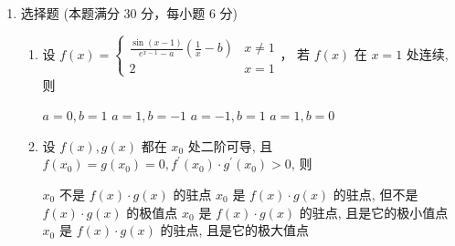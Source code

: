 \begin{enumerate}
{\begin{enumerate}
	\item
	令 $u=\sqrt[3]{x+2}$，则 $x=u^{3}-2$，$dx=3u^{2}du$，
	\begin{align*}
	\int\frac{3u^{2}}{1+u}du&=3\int\left(u-1+\frac{1}{1+u}\right)du\\
	&=\frac32u^{2}-3u+3\ln\abs{1+u}+C .
	\end{align*}
	回代 $u=\sqrt[3]{x+2}$ 即得所填结果。

	\item
	这是伯努利方程。两端除以 $x^{2}y^{2}$，令 $u=y^{-1}$（$u^{\prime}=-y^{-2}y^{\prime}$）得
	\[
	u^{\prime}-\frac{u}{x}=-\frac{1}{x^{2}},
	\quad\text{即}\quad
	\left(\frac ux\right)^{\prime}=-\frac{1}{x^{3}} .
	\]
	积分得 $\frac ux=\frac{1}{2x^{2}}+C$，即 $\frac1y=\frac{1}{2x}+Cx$，
	$y=\frac{2x}{1+2Cx^{2}}$。代入 $y(1)=2$ 得 $C=0$，故所求解为 $y=2x$
	（这是满足初值条件的特解）。

	\item
	在球面上 $\left(x^{2}+y^{2}+z^{2}\right)^{3/2}=a^{3}$；外法向单位向量为 $\frac1a(x,y,z)$，故
	\[
	x\cos\alpha+y\cos\beta+z\cos\gamma=\frac{x^{2}+y^{2}+z^{2}}{a}=a .
	\]
	于是被积函数恒为 $\frac{a}{a^{3}}=\frac{1}{a^{2}}$，
	\[
	\iint_{\Sigma}\frac{dS}{a^{2}}=\frac{1}{a^{2}}\cdot4\pi a^{2}=4\pi .
	\]
\end{enumerate}
}

\item 
选择题 (本题满分 30 分，每小题 6 分)
\begin{enumerate}
	\item
设 $f(x)=\left\{\begin{array}{ll}\frac{\sin (x-1)}{e^{x-1} - a}\left(\frac{1}{x}-b\right) & x \neq 1 \\ 2 & x=1\end{array}\right.$， 若 $f(x)$ 在 $x=1$ 处连续, 则  

	
\fourchoices
{$a=0, b=1$}
{$a=1, b=-1$}
{$a=-1, b=1$}
{$a=1, b=0$}

	
	
	\item
	设 $f(x), g(x)$ 都在 $x_{0}$ 处二阶可导, 且 $f\left(x_{0}\right)=g\left(x_{0}\right)=0, f^{\prime}\left(x_{0}\right) \cdot g^{\prime}\left(x_{0}\right)>0$, 则  
	
	
\fourchoices
{$x_{0}$ 不是 $f(x) \cdot g(x)$ 的驻点}
{$x_{0}$ 是 $f(x) \cdot g(x)$ 的驻点, 但不是 $f(x) \cdot g(x)$ 的极值点}
{$x_{0}$ 是 $f(x) \cdot g(x)$ 的驻点, 且是它的极小值点}
{$x_{0}$ 是 $f(x) \cdot g(x)$ 的驻点, 且是它的极大值点}


\end{enumerate}
\end{enumerate}
